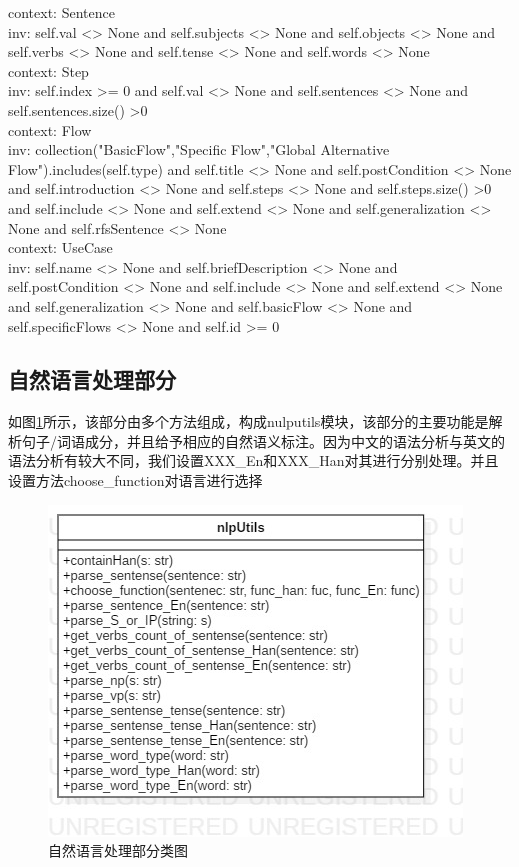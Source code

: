    	context: Sentence\\
   	inv: self.val <> None and self.subjects <> None and self.objects <> None and self.verbs <> None and self.tense <> None and self.words <> None\\
   	context: Step\\
   	inv: self.index >= 0 and self.val <> None and self.sentences <> None and self.sentences.size() >0\\
   	context: Flow\\
   	inv: collection("BasicFlow","Specific Flow","Global Alternative Flow").includes(self.type) and self.title <> None and self.postCondition <> None and self.introduction <> None 	and self.steps <> None and self.steps.size() >0 and self.include <> None and self.extend <> None and self.generalization <> None and self.rfsSentence <> None\\
   	context: UseCase\\
   	inv: self.name <> None and self.briefDescription <> None and self.postCondition <> None and self.include <> None and self.extend <> None and self.generalization <> None	and self.basicFlow <> None and self.specificFlows <> None and self.id >= 0
   	
   
    \subsection{自然语言处理部分}
	如图\ref{classDiagram_nlputils}所示，该部分由多个方法组成，构成nulputils模块，该部分的主要功能是解析句子/词语成分，并且给予相应的自然语义标注。因为中文的语法分析与英文的语法分析有较大不同，我们设置XXX\_En和XXX\_Han对其进行分别处理。并且设置方法choose\_function对语言进行选择
    	\begin{figure}
	\centering
	\includegraphics[width=.5\textwidth]{./src/classDiagram_nlputils.jpg} 
	\caption{自然语言处理部分类图} 
	\label{classDiagram_nlputils}
	\end{figure}
